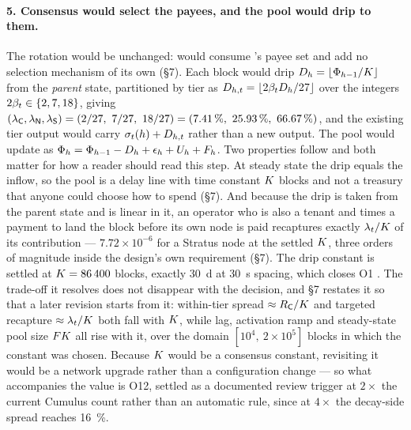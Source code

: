 \paragraph{5. Consensus would select the payees, and the pool would drip to them.}
The rotation would be unchanged: \PNR would consume \PoN's payee set and add no selection mechanism
of its own (\S7). Each block would drip $D_{h} = \lfloor \Phi_{h-1}/K \rfloor$ from the
\emph{parent} state, partitioned by tier as
$D_{h,t} = \lfloor 2\beta_{t}D_{h}/27 \rfloor$ over the integers $2\beta_{t} \in \{2,7,18\}$,
giving $(\tierratio{\tC}, \tierratio{\tN}, \tierratio{\tS}) = (2/27,\ 7/27,\ 18/27) =
(\SI{7.41}{\percent},\ \SI{25.93}{\percent},\ \SI{66.67}{\percent})$, and the existing tier output
would carry $\sigma_t(h) + D_{h,t}$ rather than a new output. The pool would update as
$\Phi_{h} = \Phi_{h-1} - D_{h} + \epsilon_{h} + U_{h} + F_{h}$. Two properties follow and
both matter for how a reader should read this step. At steady state the drip equals the inflow, so
the pool is a delay line with time constant $K$ blocks and not a treasury that anyone could
choose how to spend (\S7). And because the drip is taken from the parent state and is linear in it,
an operator who is also a tenant and times a payment to land the block before its own node is paid
recaptures exactly $\lambda_{t}/K$ of its contribution --- $7.72 \times 10^{-6}$ for a Stratus
node at the settled $K$, three orders of magnitude inside the design's own requirement (\S7). The
drip constant is settled at $K = \num{86400}$ blocks, exactly \SI{30}{\day} at \SI{30}{\second}
spacing, which closes O1 . The trade-off it resolves
does not disappear with the decision, and \S7 restates it so that a later revision starts from it:
within-tier spread $\approx R_{\mathsf{C}}/K$ and targeted recapture $\approx \lambda_{t}/K$
both fall with $K$, while lag, activation ramp and steady-state pool size $FK$ all rise with
it, over the domain $[10^{4},\ 2\times10^{5}]$ blocks in which the constant was chosen. Because
$K$ would be a consensus constant, revisiting it would be a network upgrade rather than a
configuration change --- so what accompanies the value is O12, settled as a documented review
trigger at $2\times$ the current Cumulus count rather than an automatic rule, since at $4\times$ the
decay-side spread reaches \SI{16}{\percent}.

